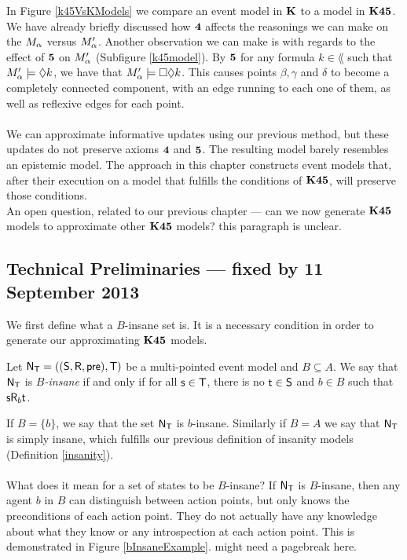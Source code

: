 In Figure \ref{k45VsKModels} we compare an event model in $\bf K$ to a model in $\bf K45$.
We have already briefly discussed how $\bf 4$ affects the reasonings we can make on the $M_\alpha$ versus
$M'_\alpha$.
Another observation we can make is with regards to the effect of $\bf 5$ on $M'_\alpha$ (Subfigure
\ref{k45model}).
By $\bf 5$ for any formula $k \in \lang$ such that $M'_\alpha \models
\Diamond k$, we have that $M'_\alpha \models \Box \Diamond k$.
This causes points $\beta, \gamma$ and $\delta$ to become a completely connected component,
with an edge running to each one of them, as well as reflexive edges for each point.\\
\\
We can approximate informative updates using our previous method, but these updates do not preserve
axioms $\bf 4$ and $\bf 5$.
The resulting model barely resembles an epistemic model.
The approach in this chapter constructs event models that, after their execution on a model that
fulfills the conditions of $\bf K45$, will preserve those conditions.
\\
An open question, related to our previous chapter --- can we now generate $\bf K45$ models to
approximate other $\bf K45$ models?
\FIXME this paragraph is unclear.

\subsection{Technical Preliminaries --- fixed by 11 September 2013}

We first define what a $B$-insane set is.
It is a necessary condition in order to generate our approximating $\bf K45$ models.

\begin{defn} \label{binsane}
	Let $\mathrm{\mathsf{N}}_\mathrm{\mathsf{T}} = ((\mathrm{\mathsf{S}}, \mathrm{\mathsf{R}}, \mathrm{\mathsf{pre}}), \mathrm{\mathsf{T}})$ be a multi-pointed event model and $B \subseteq A$.
	We say that $\mathrm{\mathsf{N}}_\mathrm{\mathsf{T}}$ is {\em $B$-insane} if and only if for all $\mathrm{\mathsf{s}} \in \mathrm{\mathsf{T}}$,
  there is no $\mathrm{\mathsf{t}} \in \mathrm{\mathsf{S}}$ and $b \in B$ such that $\mathrm{\mathsf{s}} \mathrm{\mathsf{R}}_b \mathrm{\mathsf{t}}$.
\end{defn}

If $B = \{b\}$, we say that the set $\mathrm{\mathsf{N}}_\mathrm{\mathsf{T}}$ is $b$-insane.
Similarly if $B = A$ we say that $\mathrm{\mathsf{N}}_\mathrm{\mathsf{T}}$ is simply insane, which fulfills
our previous definition of insanity models (Definition \ref{insanity}).\\
\\
What does it mean for a set of states to be $B$-insane?
If $\mathrm{\mathsf{N}}_\mathrm{\mathsf{T}}$ is $B$-insane, then any agent $b$ in $B$ can distinguish between
action points, but only knows the preconditions of each action point.
They do not actually have any knowledge about what they know or any
introspection at each action point.
This is demonstrated in Figure \ref{bInsaneExample}.
\FIXME might need a pagebreak here.

